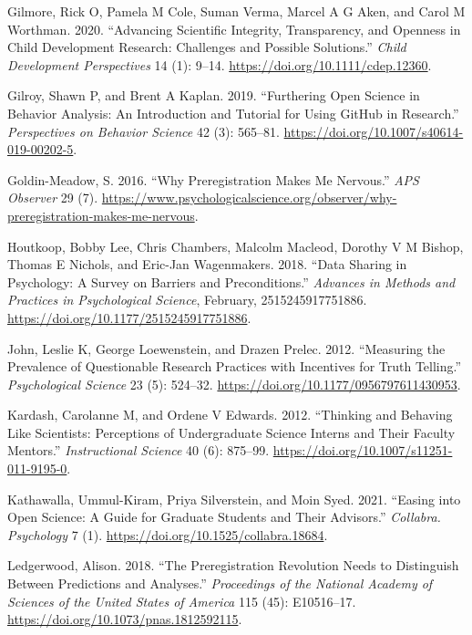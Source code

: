 \documentclass[
  letterpaper,
  DIV=11,
  numbers=noendperiod]{scrartcl}
\newlength{\cslhangindent}
\newenvironment{CSLReferences}[2] %
 {\begin{list}{}{%
  \setlength{\itemindent}{0pt}
  \setlength{\leftmargin}{0pt}
  \setlength{\parsep}{0pt}
  \ifodd #1
   \setlength{\leftmargin}{\cslhangindent}
   \setlength{\itemindent}{-1\cslhangindent}
  \fi
  \setlength{\itemsep}{#2\baselineskip}}}
 {\end{list}}
\begin{document}
\begin{CSLReferences}{1}{0}
Gilmore, Rick O, Pamela M Cole, Suman Verma, Marcel A G Aken, and Carol
M Worthman. 2020. {``Advancing Scientific Integrity, Transparency, and
Openness in Child Development Research: Challenges and Possible
Solutions.''} \emph{Child Development Perspectives} 14 (1): 9--14.
\url{https://doi.org/10.1111/cdep.12360}.

Gilroy, Shawn P, and Brent A Kaplan. 2019. {``Furthering Open Science in
Behavior Analysis: An Introduction and Tutorial for Using {GitHub} in
Research.''} \emph{Perspectives on Behavior Science} 42 (3): 565--81.
\url{https://doi.org/10.1007/s40614-019-00202-5}.

Goldin-Meadow, S. 2016. {``Why Preregistration Makes Me Nervous.''}
\emph{APS Observer} 29 (7).
\url{https://www.psychologicalscience.org/observer/why-preregistration-makes-me-nervous}.

Houtkoop, Bobby Lee, Chris Chambers, Malcolm Macleod, Dorothy V M
Bishop, Thomas E Nichols, and Eric-Jan Wagenmakers. 2018. {``Data
Sharing in Psychology: A Survey on Barriers and Preconditions.''}
\emph{Advances in Methods and Practices in Psychological Science},
February, 2515245917751886.
\url{https://doi.org/10.1177/2515245917751886}.

John, Leslie K, George Loewenstein, and Drazen Prelec. 2012.
{``Measuring the Prevalence of Questionable Research Practices with
Incentives for Truth Telling.''} \emph{Psychological Science} 23 (5):
524--32. \url{https://doi.org/10.1177/0956797611430953}.

Kardash, Carolanne M, and Ordene V Edwards. 2012. {``Thinking and
Behaving Like Scientists: Perceptions of Undergraduate Science Interns
and Their Faculty Mentors.''} \emph{Instructional Science} 40 (6):
875--99. \url{https://doi.org/10.1007/s11251-011-9195-0}.

Kathawalla, Ummul-Kiram, Priya Silverstein, and Moin Syed. 2021.
{``Easing into Open Science: A Guide for Graduate Students and Their
Advisors.''} \emph{Collabra. Psychology} 7 (1).
\url{https://doi.org/10.1525/collabra.18684}.

Ledgerwood, Alison. 2018. {``The Preregistration Revolution Needs to
Distinguish Between Predictions and Analyses.''} \emph{Proceedings of
the National Academy of Sciences of the United States of America} 115
(45): E10516--17. \url{https://doi.org/10.1073/pnas.1812592115}.


\end{CSLReferences}
\end{document}
